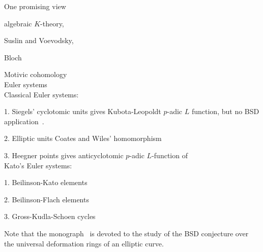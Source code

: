 One promising view

algebraic $K$-theory,

Suslin and Voevodsky,

Bloch

Motivic cohomology
{\ }\\

Euler systems~\cite{Rub2000}
{\ }\\

Classical Euler systems:

1. Siegels' cyclotomic units gives Kubota-Leopoldt $p$-adic $L$ function, but no BSD application~\cite{CS2006}.

2. Elliptic units Coates and Wiles' homomorphism

3. Heegner points gives anticyclotomic $p$-adic $L$-function of
{\ }\\

Kato's Euler systems:

1. Beilinson-Kato elements

2. Beilinson-Flach elements

3. Gross-Kudla-Schoen cycles 

Note that the monograph~\cite{Del2008} is devoted to the study of the BSD conjecture over the universal deformation rings of an elliptic curve.

